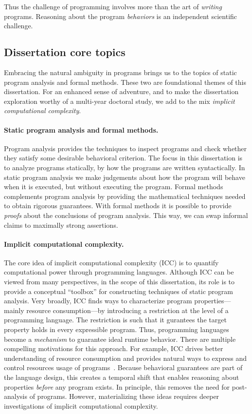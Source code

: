 \vspace{1em}\noindent{}Thus the challenge of programming involves more than the
art of \emph{writing} programs. Reasoning about the program \emph{behaviors} is
an independent scientific challenge.

\subsection{Dissertation core topics}
\label{subsec:dissertation-themes}

Embracing the natural ambiguity in programs brings us to the topics of static
program analysis and formal methods. These two are foundational themes of this
dissertation. For an enhanced sense of adventure, and to make the dissertation
exploration worthy of a multi-year doctoral study, we add to the mix
\emph{implicit computational complexity}.

\paragraph{Static program analysis and formal methods.}
Program analysis provides the techniques to inspect programs and check whether
they satisfy some desirable behavioral criterion. The focus in this dissertation
is to analyze programs statically, \ie by how the programs are written
syntactically. In static program analysis we make judgements about how the
program will behave when it is executed, but without executing the program.
Formal methods complements program analysis by providing the mathematical
techniques needed to obtain rigorous guarantees. With formal methods it is
possible to provide \emph{proofs} about the conclusions of program analysis.
This way, we can swap informal claims to maximally strong assertions.

\paragraph*{Implicit computational complexity.}
The core idea of implicit computational complexity (ICC) is to quantify
computational power through programming languages. Although ICC can be viewed
from many perspectives, in the scope of this dissertation, its role is to
provide a conceptual \enquote{toolbox} for constructing techniques of static
program analysis. Very broadly, ICC finds ways to characterize program
properties---mainly resource consumption---by introducing a restriction at the
level of a programming language. The restriction is such that it gurantees the
target property holds in every expressible program. Thus, programming languages
become a \emph{mechanism} to guarantee ideal runtime behavior. There are
multiple compelling motivations for this approach. For example, ICC drives
better understanding of resource consumption and provides natural ways to
express and control resources usage of programs~\cite{kristiansen2017}. Because
behavioral guarantees are part of the language design, this creates a temporal
shift that enables reasoning about properties \emph{before} any program exists.
In principle, this removes the need for post-analysis of programs. However,
materializing these ideas requires deeper investigations of implicit
computational complexity.

